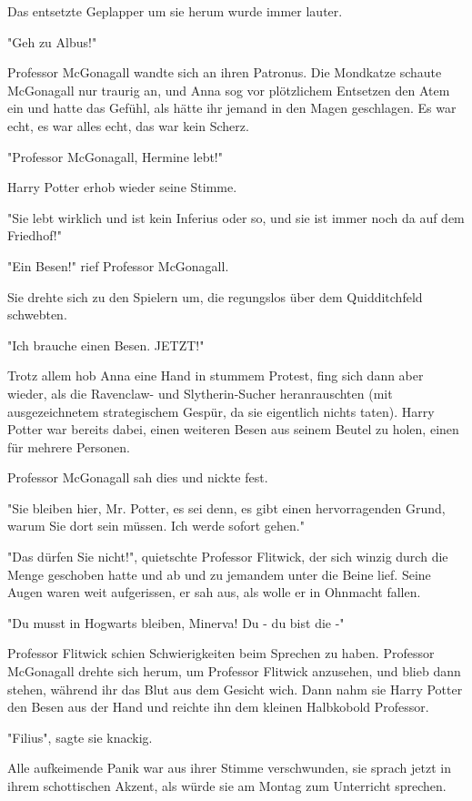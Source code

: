 {Das entsetzte Geplapper um sie herum wurde immer lauter.

"Geh zu Albus!"

Professor McGonagall wandte sich an ihren Patronus. Die Mondkatze schaute McGonagall nur traurig an, und Anna sog vor plötzlichem Entsetzen den Atem ein und hatte das Gefühl, als hätte ihr jemand in den Magen geschlagen. Es war echt, es war alles echt, das war kein Scherz.

"Professor McGonagall, Hermine lebt!"

Harry Potter erhob wieder seine Stimme.

"Sie lebt wirklich und ist kein Inferius oder so, und sie ist immer noch da auf dem Friedhof!"

"Ein Besen!" rief Professor McGonagall.

Sie drehte sich zu den Spielern um, die regungslos über dem Quidditchfeld schwebten.

"Ich brauche einen Besen. JETZT!"

Trotz allem hob Anna eine Hand in stummem Protest, fing sich dann aber wieder, als die Ravenclaw- und Slytherin-Sucher heranrauschten (mit ausgezeichnetem strategischem Gespür, da sie eigentlich nichts taten). Harry Potter war bereits dabei, einen weiteren Besen aus seinem Beutel zu holen, einen für mehrere Personen.

Professor McGonagall sah dies und nickte fest.

"Sie bleiben hier, Mr. Potter, es sei denn, es gibt einen hervorragenden Grund, warum Sie dort sein müssen. Ich werde sofort gehen."

"Das dürfen Sie nicht!", quietschte Professor Flitwick, der sich winzig durch die Menge geschoben hatte und ab und zu jemandem unter die Beine lief. Seine Augen waren weit aufgerissen, er sah aus, als wolle er in Ohnmacht fallen.

"Du musst in Hogwarts bleiben, Minerva! Du - du bist die -"

Professor Flitwick schien Schwierigkeiten beim Sprechen zu haben. Professor McGonagall drehte sich herum, um Professor Flitwick anzusehen, und blieb dann stehen, während ihr das Blut aus dem Gesicht wich. Dann nahm sie Harry Potter den Besen aus der Hand und reichte ihn dem kleinen Halbkobold Professor.

"Filius", sagte sie knackig.

Alle aufkeimende Panik war aus ihrer Stimme verschwunden, sie sprach jetzt in ihrem schottischen Akzent, als würde sie am Montag zum Unterricht sprechen.

}
